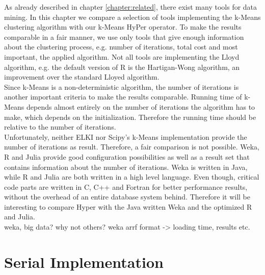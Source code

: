 As already described in chapter \ref{chapter:related}, there exist many tools for data mining. In this chapter we compare a selection of tools implementing the k-Means clustering algorithm with our k-Means HyPer operator. To make the results comparable in a fair manner, we use only tools that give enough information about the clustering process, e.g. number of iterations, total cost and most important, the applied algorithm. Not all tools are implementing the Lloyd algorithm, e.g. the default version of R is the Hartigan-Wong algorithm, an improvement over the standard Lloyed algorithm.
\\
Since k-Means is a non-deterministic algorithm, the number of iterations is another important criteria to make the results comparable. Running time of k-Means depends almost entirely on the number of iterations the algorithm has to make, which depends on the initialization. Therefore the running time should be relative to the number of iterations.
\\
Unfortunately, neither ELKI nor Scipy’s k-Means implementation provide the number of iterations as result. Therefore, a fair comparison is not possible. Weka, R and Julia provide good configuration possibilities as well as a result set that contains information about the number of iterations. Weka is written in Java, while R and Julia are both written in a high level language. Even though, critical code parts are written in C, C++ and Fortran for better performance results, without the overhead of an entire database system behind. Therefore it will be interesting to compare Hyper with the Java written Weka and the optimized R and Julia.
\\
weka, big data?
why not others?
weka arrf format -> loading time, results etc.

\section{Serial Implementation}

